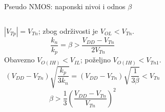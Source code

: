 \begin{frame}[label=09_2-s022]{Pseudo NMOS: naponski nivoi i odnos $\beta$}
\setlength{\abovedisplayskip}{3pt}\setlength{\belowdisplayskip}{3pt}
\begin{columns}[T,onlytextwidth]\centering \par\vspace{1mm}\centering {}$|V_{Tp}|=V_{Tn}$; zbog održivosti je $V_{OL}<V_{Tn}$.\[\frac{k_n}{k_p}=\beta>\frac{V_{DD}-V_{Tn}}{2V_{Tn}}\]
Obavezno $V_{O(IH)}<V_{IL}$; poželjno $V_{O(IH)}<V_{Tn1}$.\[(V_{DD}-V_{Tn})\sqrt{\frac{k_p}{3k_n}}=(V_{DD}-V_{Tn})\sqrt{\frac1{3\beta}}<V_{Tn}\]
\[\beta>\frac13\left(\frac{V_{DD}-V_{Tn}}{V_{Tn}}\right)^2\]
\end{columns}
\end{frame}
